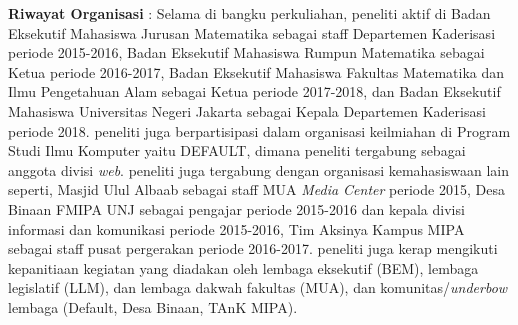 \noindent \textbf{Riwayat Organisasi} : Selama di bangku perkuliahan, peneliti aktif di Badan Eksekutif Mahasiswa Jurusan Matematika sebagai staff Departemen Kaderisasi periode 2015-2016, Badan Eksekutif Mahasiswa Rumpun Matematika sebagai Ketua periode 2016-2017, Badan Eksekutif Mahasiswa Fakultas Matematika dan Ilmu Pengetahuan Alam sebagai Ketua periode 2017-2018, dan Badan Eksekutif Mahasiswa Universitas Negeri Jakarta sebagai Kepala Departemen Kaderisasi periode 2018. peneliti juga berpartisipasi dalam organisasi keilmiahan di Program Studi Ilmu Komputer yaitu DEFAULT, dimana peneliti tergabung sebagai anggota divisi \textit{web}. peneliti juga tergabung dengan organisasi kemahasiswaan lain seperti, Masjid Ulul Albaab sebagai staff MUA \textit{Media Center} periode 2015, Desa Binaan FMIPA UNJ sebagai pengajar periode 2015-2016 dan kepala divisi informasi dan komunikasi periode 2015-2016, Tim Aksinya Kampus MIPA sebagai staff pusat pergerakan periode 2016-2017. peneliti juga kerap mengikuti kepanitiaan kegiatan yang diadakan oleh lembaga eksekutif (BEM), lembaga legislatif (LLM), dan lembaga dakwah fakultas (MUA), dan komunitas/\textit{underbow} lembaga (Default, Desa Binaan, TAnK MIPA). 